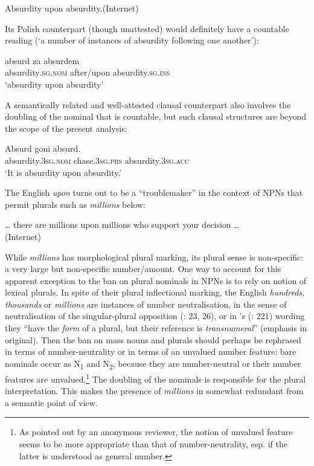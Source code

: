 \documentclass[output=paper]{langscibook}
\begin{document}
\ea \label{psk:ex:key:5}  Absurdity upon absurdity.\hfill (Internet)\\
\z

\noindent Its Polish counterpart (though unattested) would definitely have a countable reading (‘a number of instances of absurdity following one another’):

\ea\gll\label{psk:ex:key:6}absurd                za             absurdem\\
       absurdity\textsc{.sg.nom} after/upon absurdity.\textsc{sg.ins}\\
\glt   ‘absurdity upon absurdity’\z

\noindent A semantically related and well-attested clausal counterpart also involves the doubling of the nominal that is countable, but such clausal structures are beyond the scope of the present analysis:

\ea\gll\label{psk:ex:key:7}Absurd                 goni              absurd.\\
       absurdity.\textsc{3sg.nom} chase.\textsc{3sg.prs} absurdity.\textsc{3sg.acc}\\
\glt ‘It is absurdity upon absurdity.’
\z

\noindent The English \textit{upon} turns out to be a ``troublemaker'' in the context of NPNs that permit plurals such as \textit{millions} below:\largerpage

\ea \label{psk:ex:key:8}  … there are millions upon millions who support your decision …\vspace{-12pt}\\\null\hfill (Internet)\\
\z

\noindent While \textit{millions} has morphological plural marking, its plural sense is non-specific: a very large but non-specific number/amount. One way to account for this apparent exception to the ban on plural nominals in NPNs is to rely on  notion of lexical plurals. In spite of their plural inflectional marking, the English \textit{hundreds}, \textit{thousands} or \textit{millions} are instances of number neutralisation, in the sense of neutralisation of the singular-plural opposition (\citealt{Acquaviva2008}: 23, 26), or in \citeauthor{Link1998}'s (\citeyear{Link1998}: 221) wording they “have the \textit{form} of a plural, but their reference is \textit{transnumeral}” (emphasis in original). Then the ban on mass nouns and plurals should perhaps be rephrased in terms of number-neutrality or in terms of an unvalued number feature: bare nominals occur as N\textsubscript{1} and N\textsubscript{2}, because they are number-neutral or their number features are unvalued.\footnote{As pointed out by an anonymous reviewer, the notion of unvalued feature seems to be more appropriate than that of number-neutrality, esp. if the latter is understood as general number.} The doubling of the nominals is responsible for the plural interpretation. This makes the presence of \textit{millions} in  somewhat redundant from a semantic point of view.
\end{document}
